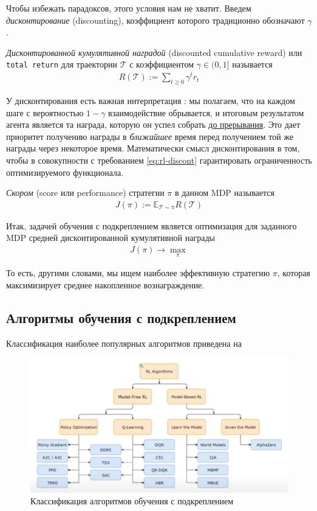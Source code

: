 \documentclass[%
	11pt,
	a4paper,
	utf8,
		]{article}
\begin{document}
Чтобы избежать парадоксов, этого условия нам не хватит. Введем \emph{дисконтирование} (discounting), коэффициент которого традиционно обозначают $ \gamma $.

\emph{Дисконтированной кумулятивной наградой} (discounted cumulative reward) или \texttt{total return} для траектории $ \mathcal{T} $ с коэффициентом $ \gamma \in (0, 1] $ называется
\begin{align*}
	R(\mathcal{T}) := \sum_{t \geqslant 0} \gamma^t r_t
\end{align*}

У дисконтирования есть важная интерпретация \cite[]{ivanov:rl-2022}: мы полагаем, что на каждом шаге с вероятностью $ 1 - \gamma $ взаимодействие обрывается, и итоговым результатом агента является та награда, которую он успел собрать \underline{до прерывания}. Это дает приоритет получению награды в \emph{ближайшее} время перед получением той же награды через некоторое время. Математически смысл дисконтирования в том, чтобы в совокупности с требованием \eqref{eq:rl-discont} гарантировать ограниченность оптимизируемого функционала.

\emph{Скором} (score  или performance) стратегии $ \pi $ в данном MDP называется \cite[]{ivanov:rl-2022} 
\begin{align*}
	J(\pi) := \mathbb{E}_{\mathcal{T} \sim \pi} R(\mathcal{T})
\end{align*}

Итак, задачей обучения с подкреплением является оптимизация для заданного MDP средней дисконтированной кумулятивной награды
\begin{align*}
	J(\pi) \rightarrow \underset{\pi}{\max}
\end{align*}

То есть, другими словами, мы ищем наиболее эффективную стратегию $ \pi $, которая максимизирует среднее накопленное вознаграждение.

\subsection{Алгоритмы обучения с подкреплением}

Классификация наиболее популярных алгоритмов приведена на 

\begin{figure}[h]
	\centering
	\includegraphics[scale=0.85]{figures/classif_rl_algo.png}
	\caption{ Классификация алгоритмов обучения с подкреплением }\label{fig:classif_rl_algo}
\end{figure}
\end{document}
